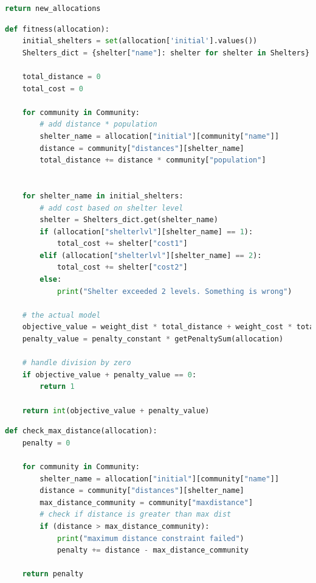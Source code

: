\begin{appendices}
\begin{centerappendixtitle}
\begin{lstlisting}[language=Python,caption={Genetic Algorithm - Mutation}, label={mutationCode}]
    return new_allocations
\end{lstlisting}

\pagebreak
\begin{lstlisting}[language=Python,caption={Objective Value}, label={objValCode}]
def fitness(allocation):
    initial_shelters = set(allocation['initial'].values())
    Shelters_dict = {shelter["name"]: shelter for shelter in Shelters}

    total_distance = 0
    total_cost = 0

    for community in Community:
        # add distance * population
        shelter_name = allocation["initial"][community["name"]]
        distance = community["distances"][shelter_name]
        total_distance += distance * community["population"]


    for shelter_name in initial_shelters:
        # add cost based on shelter level
        shelter = Shelters_dict.get(shelter_name)
        if (allocation["shelterlvl"][shelter_name] == 1):
            total_cost += shelter["cost1"] 
        elif (allocation["shelterlvl"][shelter_name] == 2):
            total_cost += shelter["cost2"] 
        else:
            print("Shelter exceeded 2 levels. Something is wrong")
        
    # the actual model
    objective_value = weight_dist * total_distance + weight_cost * total_cost
    penalty_value = penalty_constant * getPenaltySum(allocation)

    # handle division by zero
    if objective_value + penalty_value == 0:
        return 1

    return int(objective_value + penalty_value)
\end{lstlisting}

\begin{lstlisting}[language=Python,caption={Maximum Distance Constraint}, label={maxdistCode}]
def check_max_distance(allocation):
    penalty = 0

    for community in Community:
        shelter_name = allocation["initial"][community["name"]]
        distance = community["distances"][shelter_name]
        max_distance_community = community["maxdistance"]
        # check if distance is greater than max dist
        if (distance > max_distance_community):
            print("maximum distance constraint failed")
            penalty += distance - max_distance_community
        
    return penalty
\end{lstlisting}


\end{centerappendixtitle}
\end{appendices}
